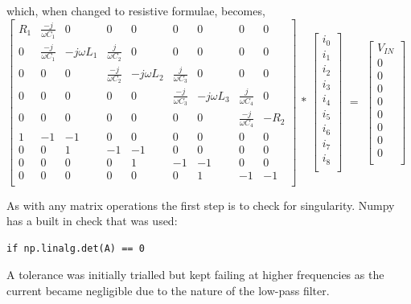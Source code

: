 \documentclass[11pt,a4paper]{article}
\begin{document}
which, when changed to resistive formulae, becomes,\\

$\begin{bmatrix*}
	R_{1} & \frac{-j}{\omega C_{1}} & 0 & 0 & 0 & 0 & 0 & 0 & 0 \\
	0 & \frac{-j}{\omega C_{1}} & -j \omega L_{1} & \frac{j}{\omega C_{2}} & 0 & 0 & 0 & 0 & 0\\
	0 & 0 &  0 & \frac{-j}{\omega C_{2}} & -j \omega L_{2} & \frac{j}{\omega C_{3}} & 0 & 0 & 0\\
	0 & 0 & 0 & 0 & 0 & \frac{-j}{\omega C_{3}} & -j \omega L_{3} & \frac{j}{\omega C_{4}} & 0\\
	0 & 0 & 0 & 0 & 0 & 0 & 0 & \frac{-j}{\omega C_{4}} & -R_{2}\\
	1 & -1 & -1 & 0 & 0 & 0 & 0 & 0 & 0\\
	0 & 0 & 1 & -1 & -1 & 0 & 0 & 0 & 0\\
	0 & 0 & 0 & 0 & 1 & -1 & -1 & 0 & 0\\
	0 & 0 & 0 & 0 & 0 & 0 & 1 & -1 & -1\\
\end{bmatrix*}$
$ * $
$\begin{bmatrix}
	i_{0}\\
	i_{1}\\
	i_{2}\\
	i_{3}\\
	i_{4}\\
	i_{5}\\
	i_{6}\\
	i_{7}\\
	i_{8}\\
\end{bmatrix}$ 
$ = $
$\begin{bmatrix}
	V_{IN}\\
	0\\
	0\\
	0\\
	0\\
	0\\
	0\\
	0\\
	0\\
\end{bmatrix}$\\\medskip

As with any matrix operations the first step is to check for singularity. Numpy has a built in check that was used:
\begin{lstlisting}
if np.linalg.det(A) == 0
\end{lstlisting}
A tolerance was initially trialled but kept failing at higher frequencies as the current became negligible due to the nature of the low-pass filter.\\
\end{document}
